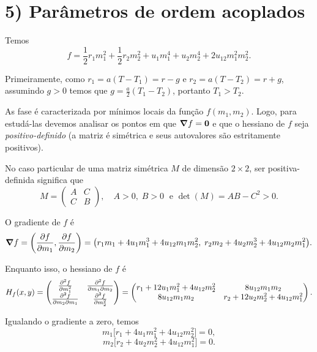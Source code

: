 \documentclass[a4paper,10pt]{article}
\begin{document}
\pagebreak

\section*{5) Parâmetros de ordem acoplados}

Temos
$$
f = \frac{1}{2} r_1 m_1^2 + \frac{1}{2} r_2 m_2^2 + u_1 m_1^4 + u_2 m_2^4 + 2 u_{12} m_1^2 m_2^2.
$$

Primeiramente, como $r_1 = a(T - T_1) = r - g$ e $r_2 = a(T - T_2) = r + g$, assumindo $g > 0$ temos que $g = \frac{a}{2} (T_1 - T_2)$, portanto $T_1 > T_2$.

\n

As fase é caracterizada por mínimos locais da função $f(m_1, m_2)$. Logo, para estudá-las devemos analisar os pontos em que $\grad{f} = \vb{0}$ e que o hessiano de $f$ seja \textit{positivo-definido} (a matriz é simétrica e seus autovalores são estritamente positivos).

\n

No caso particular de uma matriz simétrica $M$ de dimensão $2 \times 2$, ser positiva-definida significa que
$$
M =
\begin{pmatrix}
A & C \\
C & B
\end{pmatrix}
, \quad A > 0, \; B > 0 \; \text{ e } \det(M) = AB - C^2 > 0.
$$

O gradiente de $f$ é
$$
\grad{f} = \qty(\pdv{f}{m_1}, \pdv{f}{m_2}) =
\qty(r_1 m_1 + 4u_1 m_1^3 + 4u_{12} m_1 m_2^2, \; r_2 m_2 + 4u_2 m_2^3 + 4u_{12} m_2 m_1^2).
$$

Enquanto isso, o hessiano de $f$ é
$$
H_f(x, y) =
\begin{pmatrix}
\pdv[2]{f}{m_1} & \pdv{f}{m_1}{m_2} \\
\pdv{f}{m_2}{m_1} & \pdv[2]{f}{m_2}
\end{pmatrix}
=
\begin{pmatrix}
r_1 + 12 u_1 m_1^2 + 4 u_{12} m_2^2  & 8 u_{12} m_1 m_2 \\
8 u_{12} m_1 m_2 & r_2 + 12 u_2 m_2^2 + 4 u_{12} m_1^2
\end{pmatrix}.
$$


Igualando o gradiente a zero, temos
$$
m_1 \Big[
r_1 + 4 u_1 m_1^2 + 4 u_{12} m_2^2
\Big] = 0,
$$
$$
m_2 \Big[
r_2 + 4 u_2 m_2^2 + 4 u_{12} m_1^2
\Big] = 0.
$$
\end{document}
